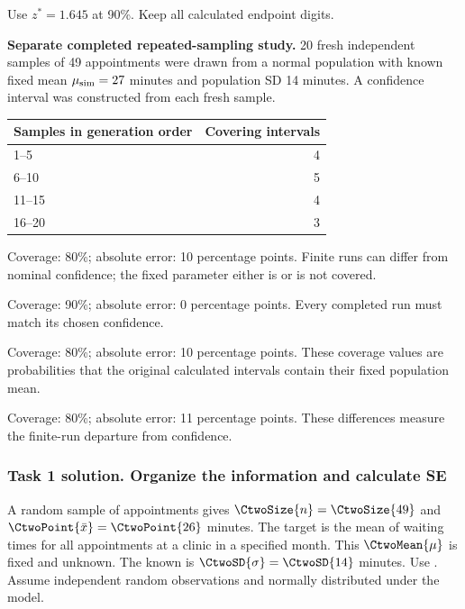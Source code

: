 Use $z^*=1.645$ at 90\%. Keep all calculated endpoint digits.

\textbf{Separate completed repeated-sampling study.} 20 fresh independent samples of 49 appointments were drawn from a normal population with known fixed mean $\mu_{\rm sim}=27$ minutes and population SD 14 minutes. A confidence interval was constructed from each fresh sample.
\begin{center}\begin{tabular}{@{}lr@{}}\toprule
Samples in generation order & Covering intervals\\\midrule
1--5 & 4 \\[6pt]
6--10 & 5 \\[6pt]
11--15 & 4 \\[6pt]
16--20 & 3 \\[6pt]
\bottomrule\end{tabular}\end{center}

\begin{answeroptions}
\item Coverage: 80\%; absolute error: 10 percentage points. Finite runs can differ from nominal confidence; the fixed parameter either is or is not covered.
\item Coverage: 90\%; absolute error: 0 percentage points. Every completed run must match its chosen confidence.
\item Coverage: 80\%; absolute error: 10 percentage points. These coverage values are probabilities that the original calculated intervals contain their fixed population mean.
\item Coverage: 80\%; absolute error: 11 percentage points. These differences measure the finite-run departure from confidence.
\end{answeroptions}
\clearpage
\subsubsection*{Task 1 solution. Organize the information and calculate SE}
\label{sol:c2-3-a}
A random sample of  appointments gives $\CtwoSize{n}=\CtwoSize{49}$ and  $\CtwoPoint{\bar{x}}=\CtwoPoint{26}$ minutes. The target is the mean of waiting times for all appointments at a clinic in a specified month. This  $\CtwoMean{\mu}$ is fixed and unknown. The known  is $\CtwoSD{\sigma}=\CtwoSD{14}$ minutes. Use  . Assume independent random observations and normally distributed  under the model.

